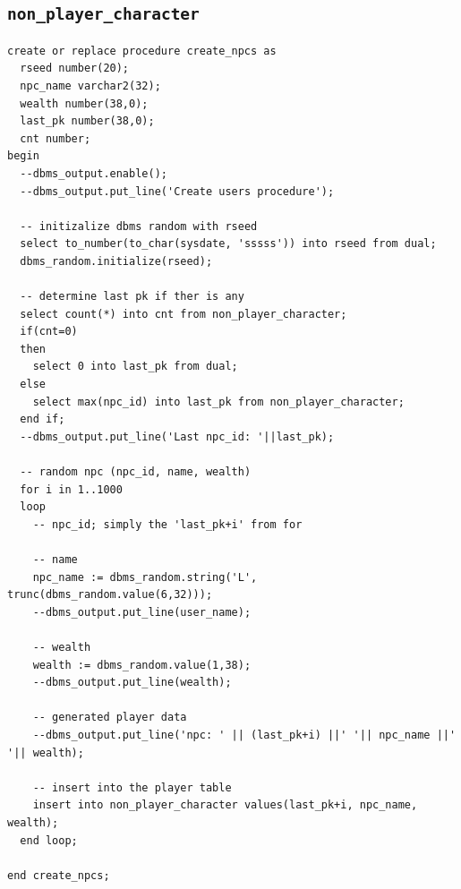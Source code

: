 \documentclass[11pt]{article}
\begin{document}
\subsection{\texttt{non\_player\_character}}
\label{sec:orga7ba462}
\begin{verbatim}
create or replace procedure create_npcs as
  rseed number(20);
  npc_name varchar2(32);
  wealth number(38,0);
  last_pk number(38,0);
  cnt number;
begin
  --dbms_output.enable();
  --dbms_output.put_line('Create users procedure');

  -- initizalize dbms random with rseed
  select to_number(to_char(sysdate, 'sssss')) into rseed from dual;
  dbms_random.initialize(rseed);

  -- determine last pk if ther is any
  select count(*) into cnt from non_player_character;
  if(cnt=0)
  then
    select 0 into last_pk from dual;
  else
    select max(npc_id) into last_pk from non_player_character;
  end if;
  --dbms_output.put_line('Last npc_id: '||last_pk);

  -- random npc (npc_id, name, wealth)
  for i in 1..1000
  loop
    -- npc_id; simply the 'last_pk+i' from for

    -- name
    npc_name := dbms_random.string('L', trunc(dbms_random.value(6,32)));
    --dbms_output.put_line(user_name);

    -- wealth
    wealth := dbms_random.value(1,38);
    --dbms_output.put_line(wealth);

    -- generated player data
    --dbms_output.put_line('npc: ' || (last_pk+i) ||' '|| npc_name ||' '|| wealth);

    -- insert into the player table
    insert into non_player_character values(last_pk+i, npc_name, wealth);
  end loop;

end create_npcs;
\end{verbatim}
\end{document}
